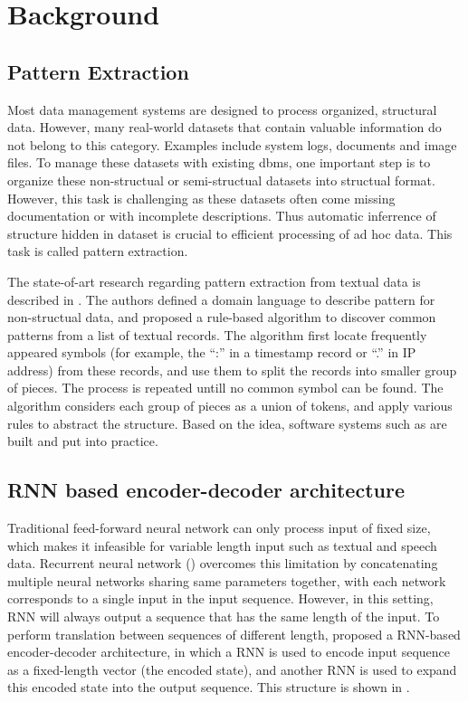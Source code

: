 \documentclass{article}
\begin{document}
\section{Background}\label{sec:background}
\subsection{Pattern Extraction}
Most data management systems are designed to process organized, structural data. However, many real-world datasets that contain valuable information do not belong to this category. Examples include system logs, documents and image files. To manage these datasets with existing dbms, one important step is to organize these non-structual or semi-structual datasets into structual format. However, this task is challenging as these datasets often come missing documentation or with incomplete descriptions. Thus automatic inferrence of structure hidden in dataset  is crucial to efficient processing of ad hoc data. This task is called pattern extraction.

The state-of-art research regarding pattern extraction from textual data is described in \cite{dirt_2008}. The authors defined a domain language to describe pattern for non-structual data, and proposed a rule-based algorithm to discover common patterns from a list of textual records. The algorithm first locate frequently appeared symbols (for example, the ``:'' in a timestamp record or ``.'' in IP address) from these records, and use them to split the records into smaller group of pieces. The process is repeated untill no common symbol can be found. The algorithm considers each group of pieces as a union of tokens, and apply various rules to abstract the structure. Based on the idea, software systems such as \cite{pads,recbreaker} are built and put into practice. 

\subsection{RNN based encoder-decoder architecture}
Traditional feed-forward neural network can only process input of fixed size, which makes it infeasible for variable length input such as textual and speech data. Recurrent neural network (\cite{rnn_1988, rnn_1990}) overcomes this limitation by concatenating multiple neural networks sharing same parameters together, with each network corresponds to a single input in the input sequence. However, in this setting, RNN will always output a sequence that has the same length of the input. To perform translation between sequences of different length, \cite{rnned_2014} proposed a RNN-based encoder-decoder architecture, in which a RNN is used to encode input sequence as a fixed-length vector (the encoded state), and another RNN is used to expand this encoded state into the output sequence. This structure  is shown in . 
\end{document}
